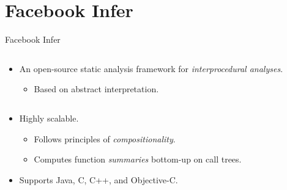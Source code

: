 \documentclass[%
    10pt, xcolor=pdflatex, hyperref={unicode}, aspectratio=169%
]{beamer}
\begin{document}
\section{Facebook Infer}
\begin{frame}{Facebook Infer}
    \begin{columns}
        \begin{column}{1 \linewidth}
            \begin{itemize}
                \item
                    An open-source \alert{static analysis framework}
                    for \emph{interprocedural analyses}.

                    \smallskip

                    \begin{itemize}\setlength\itemsep{1em}
                        \item
                            Based on \alert{abstract interpretation}.
                    \end{itemize}
            \end{itemize}
        \end{column}

        \hfill
    \end{columns}

    \begin{columns}
        \begin{column}{.55 \linewidth}
            \begin{itemize}\setlength\itemsep{2em}
                \item
                    \alert{Highly scalable}.

                    \smallskip

                    \begin{itemize}\setlength\itemsep{1em}
                        \item
                            Follows principles of \emph{compositionality}.

                        \item
                            Computes function \emph{summaries} bottom-up
                            on call trees.
                    \end{itemize}

                \item
                    Supports Java, C, C++, and Objective-C.
            \end{itemize}
        \end{column}


\end{columns}
\end{frame}
\end{document}

